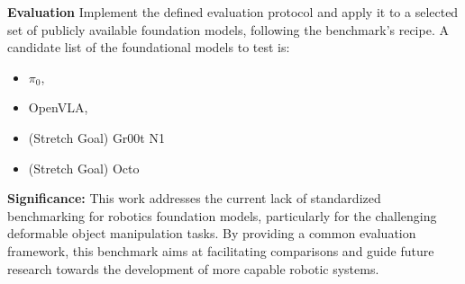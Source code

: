     \textbf{Evaluation}
        Implement the defined evaluation protocol and apply it to a selected set of publicly available foundation models, following the benchmark's recipe. A candidate list of the foundational models to test is:
        \begin{itemize}
            \item $\pi_0$, \cite{pi_zero}
            \item OpenVLA, \cite{OpenVLA}
            \item (Stretch Goal) Gr00t N1 \cite{Gr00tN1}
            \item (Stretch Goal) Octo \cite{Octo}
        \end{itemize}
        


\textbf{Significance:} This work addresses the current lack of standardized benchmarking for robotics foundation models, particularly for the challenging deformable object manipulation tasks. By providing a common evaluation framework, this benchmark aims at facilitating comparisons and guide future research towards the development of more capable robotic systems.